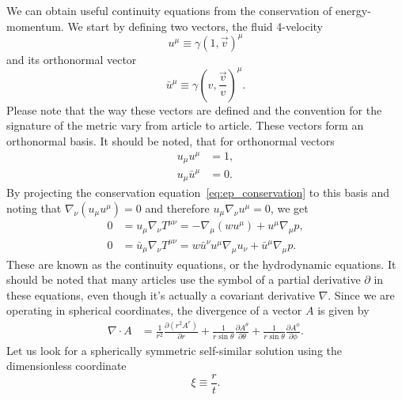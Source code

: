 We can obtain useful continuity equations from the conservation of energy-momentum.
We start by defining two vectors, the fluid 4-velocity
\begin{equation}
u^\mu \equiv \gamma(1, \overrightarrow{v})^\mu
\label{eq:u_mu}
\end{equation}
and its orthonormal vector
\begin{equation}
\bar{u}^\mu \equiv \gamma(v, \frac{\overrightarrow{v}}{v})^\mu.
\end{equation}
Please note that the way these vectors are defined and the convention for the signature of the metric vary
from article to article.
These vectors form an orthonormal basis.
It should be noted, that for orthonormal vectors
\cite[p. 36]{lecture_notes}
\begin{align}
u_\mu u^\mu &= 1, \\
u_\mu \bar{u}^\mu &= 0.
\end{align}
By projecting the conservation equation~\eqref{eq:ep_conservation} to this basis and noting that
$\nabla_\nu (u_\mu u^\mu) = 0$ and therefore $u_\mu \nabla_\nu u^\mu = 0$, we get
\cite[eq. 7.28-7.29]{lecture_notes}
\begin{align}
0 &= u_\mu \nabla_\nu T^{\mu \nu} = -\nabla_\mu (w u^\mu) + u^\mu \nabla_\mu p,
\label{eq:continuity1} \\
0 &= \bar{u}_\mu \nabla_\nu T^{\mu \nu} = w \bar{u}^\nu u^\mu \nabla_\mu u_\nu + \bar{u}^\mu \nabla_\mu p.
\label{eq:continuity2}
\end{align}
These are known as the continuity equations, or the hydrodynamic equations.
It should be noted that many articles use the symbol of a partial derivative $\partial$ in these equations,
even though it's actually a covariant derivative $\nabla$.
Since we are operating in spherical coordinates,
the divergence of a vector $A$ is given by
\begin{align}
\nabla \cdot A
&= \frac{1}{r^2} \frac{\partial (r^2 A^r)}{\partial r}
+ \frac{1}{r \sin \theta} \frac{\partial A^\theta}{\partial \theta}
+ \frac{1}{r \sin \theta} \frac{\partial A^\phi}{\partial \phi}.
\label{eq:divergence}
\end{align}
Let us look for a spherically symmetric self-similar solution using the dimensionless coordinate
\begin{equation}
\xi \equiv \frac{r}{t}.
\label{eq:xi}
\end{equation}
